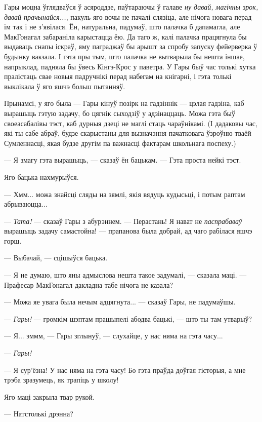 Гары моцна ўглядваўся ў асяроддзе, паўтараючы ў галаве \emph{
ну давай, магічны зрок, давай прачынайся...},
пакуль яго вочы не пачалі слязіца, але нічога новага перад ім так і не з'явілася.
Ён, натуральна, падумаў, што палачка б дапамагла, але МакГонагал забараніла
карыстацца ёю. Да таго ж, калі палачка працягнула бы выдаваць снапы іскраў,
яму паграджаў бы арышт за спробу запуску фейерверка ў будынку вакзала.
І гэта пры тым, што палачка не вытварыла бы нешта іншае, напрыклад, 
падняла бы ўвесь Кінгз-Крос у паветра. 
У Гары быў час толькі хутка пралістаць свае новыя падручнікі перад набегам
на кнігарні, і гэта толькі выклікала ў яго яшчэ больш пытанняў.

Прынамсі, у яго была --- Гары кінуў позірк на гадзіннік --- цэлая гадзіна, каб
вырашыць гэтую задачу, бо цягнік сыходзіў у адзінаццаць. Можа гэта быў
своеасабалівы  тэст, каб дурныя дзеці не маглі стаць чараўнікамі.
(І дадаковы час, які ты сабе абраў, будзе скарыстаны для вызначэння
пачатковага ўзроўню тваёй Сумленнасці, якая будзе другім па важнасці фактарам
школьнага поспеху.)

--- Я змагу гэта вырашыць, --- сказаў ён бацькам. --- Гэта проста нейкі тэст.

Яго бацька нахмурыўся.

--- Хмм... можа знайсці сляды на зямлі, якія вядуць кудысьці, і потым раптам
абрываюцца...

--- \emph{Тата!} --- сказаў Гары з абурэннем. --- Перастань! Я нават не \emph{паспрабаваў} 
вырашыць задачу самастойна! --- прапанова была добрай, ад чаго рабілася яшчэ 
горш.

--- Выбачай, --- сцішыўся бацька.

--- Я не думаю, што яны адмыслова нешта такое задумалі, --- сказала маці. ---
Прафесар МакГонагал дакладна табе нічога не казала?

--- Можа яе увага была нечым адцягнута... --- сказаў Гары, не падумаўшы.

--- \emph{Гары!} --- громкім шэптам прашыпелі абодва бацькі, --- што ты там 
утварыў?

--- Я... эммм, --- Гары зглынуў, --- слухайце, у нас няма на гэта часу...

--- \emph{Гары!}

--- Я сур'ёзна! У нас няма на гэта часу! Бо гэта праўда доўгая гісторыя, а мне
трэба зразумець, як трапіць у школу!

Яго маці закрыла твар рукой.

--- Натстолькі дрэнна?

